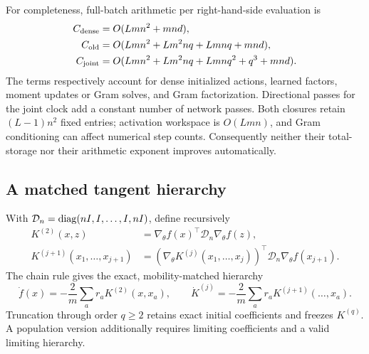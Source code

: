 For completeness, full-batch arithmetic per right-hand-side evaluation is
\begin{align}
 C_{\rm dense}&=O(Lmn^2+mnd),\nonumber\\
 C_{\rm old}&=O(Lmn^2+Lm^2nq+Lmnq+mnd),\nonumber\\
 C_{\rm joint}&=O(Lmn^2+Lm^2nq+Lmnq^2+q^3+mnd).
 \label{cmp:response-work}
\end{align}
The terms respectively account for dense initialized actions, learned factors,
moment updates or Gram solves, and Gram factorization.  Directional passes for
the joint clock add a constant number of network passes.  Both closures retain
$(L-1)n^2$ fixed entries; activation workspace is $O(Lmn)$, and Gram
conditioning can affect numerical step counts.  Consequently neither their
total-storage nor their arithmetic exponent improves automatically.

\subsection{A matched tangent hierarchy}
\label{app:comparison-nth}

With $\mathcal D_n=\operatorname{diag}(nI,I,\ldots,I,nI)$, define recursively
\begin{align*}
K^{(2)}(x,z)&=\nabla_\theta f(x)^\top\mathcal D_n\nabla_\theta f(z),\\
K^{(j+1)}(x_1,\ldots,x_{j+1})&=
(\nabla_\theta K^{(j)}(x_1,\ldots,x_j))^\top
\mathcal D_n\nabla_\theta f(x_{j+1}).
\end{align*}
The chain rule gives the exact, mobility-matched hierarchy
\begin{equation}
 \dot f(x)=-\frac{2}{m}\sum_a r_aK^{(2)}(x,x_a),\qquad
 \dot K^{(j)}=-\frac{2}{m}\sum_a r_aK^{(j+1)}(\ldots,x_a).
 \label{cmp:nth-flow}
\end{equation}
Truncation through order $q\ge2$ retains exact initial coefficients and freezes
$K^{(q)}$.  A population version additionally requires limiting coefficients
and a valid limiting hierarchy.

